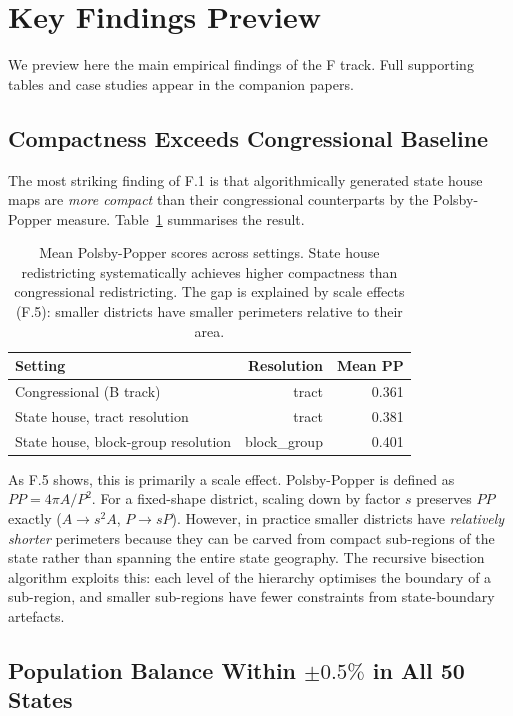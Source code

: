 \section{Key Findings Preview}
\label{sec:findings}

We preview here the main empirical findings of the F track. Full supporting
tables and case studies appear in the companion papers.

\subsection{Compactness Exceeds Congressional Baseline}
\label{sec:findings:compactness}

The most striking finding of F.1 is that algorithmically generated state
house maps are \emph{more compact} than their congressional counterparts by
the Polsby-Popper measure. Table~\ref{tab:pp-comparison} summarises the result.

\begin{table}[h]
\centering\small
\begin{tabular}{lrr}
\toprule
Setting & Resolution & Mean PP \\
\midrule
Congressional (B track) & tract & 0.361 \\
State house, tract resolution & tract & 0.381 \\
State house, block-group resolution & block\_group & 0.401 \\
\bottomrule
\end{tabular}
\caption{Mean Polsby-Popper scores across settings. State house redistricting
  systematically achieves higher compactness than congressional redistricting.
  The gap is explained by scale effects (F.5): smaller districts have smaller
  perimeters relative to their area.}
\label{tab:pp-comparison}
\end{table}

As F.5 shows, this is primarily a scale effect. Polsby-Popper is defined as
$PP = 4\pi A / P^2$. For a fixed-shape district, scaling down by factor $s$
preserves $PP$ exactly ($A \to s^2 A$, $P \to s P$). However, in practice
smaller districts have \emph{relatively shorter} perimeters because they
can be carved from compact sub-regions of the state rather than spanning
the entire state geography. The recursive bisection algorithm exploits this:
each level of the hierarchy optimises the boundary of a sub-region, and
smaller sub-regions have fewer constraints from state-boundary artefacts.

\subsection{Population Balance Within $\pm 0.5\%$ in All 50 States}
\label{sec:findings:balance}

